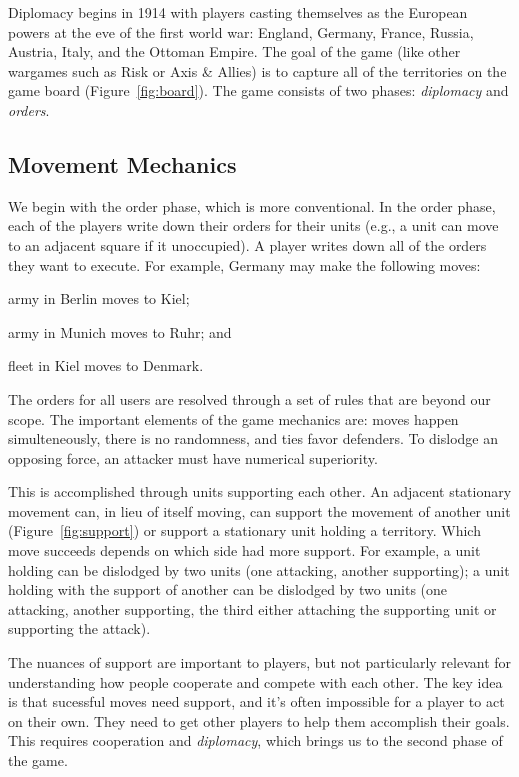 \documentclass[11pt,letterpaper]{article}
\begin{document}
Diplomacy begins in 1914 with players casting themselves as the
European powers at the eve of the first world war: England, Germany,
France, Russia, Austria, Italy, and the Ottoman Empire.  The goal of
the game (like other wargames such as Risk or Axis \& Allies) is to
capture all of the territories on the game board
(Figure~\ref{fig:board}).  The game consists of two
phases: \emph{diplomacy} and \emph{orders}.

\subsection{Movement Mechanics}
\label{sec:mechanics}

We begin with the order phase, which is more conventional.  In the
order phase, each of the players write down their orders for their
units (e.g., a unit can move to an adjacent square if it unoccupied).
A player writes down all of the orders they want to execute.  For
example, Germany may make the following moves:
\begin{itemize*}
        \item army in Berlin moves to Kiel;
        \item army in Munich moves to Ruhr; and
        \item fleet in Kiel moves to Denmark.
\end{itemize*}

The orders for all users are resolved through a set of rules that are
beyond our scope.  The important elements of the game mechanics are:
moves happen simulteneously, there is no randomness, and ties favor
defenders.  To dislodge an opposing force, an attacker must have
numerical superiority.

This is accomplished through units supporting each other.  An adjacent
stationary movement can, in lieu of itself moving, can support the
movement of another unit (Figure~\ref{fig:support}) or support a
stationary unit holding a territory.  Which move succeeds depends on
which side had more support.  For example, a unit holding can be
dislodged by two units (one attacking, another supporting); a unit
holding with the support of another can be dislodged by two units (one
attacking, another supporting, the third either attaching the
supporting unit or supporting the attack).

The nuances of support are important to players, but not particularly
relevant for understanding how people cooperate and compete with each
other.  The key idea is that sucessful moves need support, and it's
often impossible for a player to act on their own.  They need to get
other players to help them accomplish their goals.  This requires
cooperation and \emph{diplomacy}, which brings us to the second phase
of the game.
\end{document}
